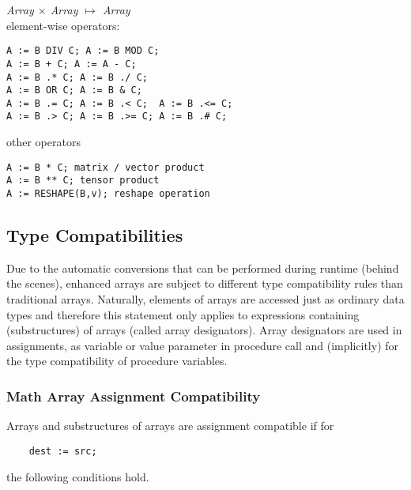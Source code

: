 \documentclass[a4wide,11pt]{article}
\begin{document}
\emph{Array $\times$ Array $\mapsto$ Array}
\\element-wise operators:
\begin{lstlisting}[style=example]
A := B DIV C; A := B MOD C;
A := B + C; A := A - C;
A := B .* C; A := B ./ C;
A := B OR C; A := B & C;
A := B .= C; A := B .< C;  A := B .<= C;
A := B .> C; A := B .>= C; A := B .# C;
\end{lstlisting}

other operators
\begin{lstlisting}[style=example]
A := B * C; matrix / vector product
A := B ** C; tensor product
A := RESHAPE(B,v); reshape operation
\end{lstlisting}

\subsection{Type Compatibilities}
Due to the automatic conversions that can be performed during runtime (behind the scenes), enhanced arrays are subject to different type compatibility rules than traditional arrays.
Naturally, elements of arrays are accessed just as ordinary data types and therefore this statement only applies to expressions containing (substructures) of arrays (called array designators).
Array designators are used in assignments, as variable or value parameter in procedure call and (implicitly) for the type compatibility of procedure variables.

\subsubsection{Math Array Assignment Compatibility}
Arrays and substructures of arrays are assignment compatible if for
\begin{lstlisting}
    dest := src;
\end{lstlisting}
the following conditions hold.
\end{document}
